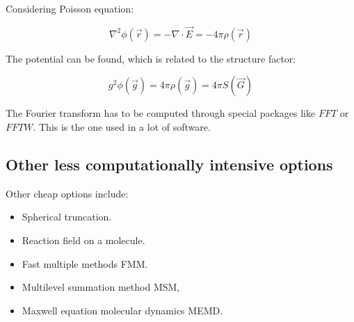 	Considering Poisson equation:

	$$\nabla^2\phi(\vec{r}) = -\nabla\cdot\vec{E} = -4\pi\rho(\vec{r})$$

	The potential can be found, which is related to the structure factor:

	$$g^2\phi(\vec{g}) = 4\pi\rho(\vec{g}) = 4\pi S(\vec{G})$$

	The Fourier transform has to be computed through special packages like $FFT$ or $FFTW$.
	This is the one used in a lot of software.

	\subsection{Other less computationally intensive options}
	Other cheap options include:

	\begin{multicols}{2}
		\begin{itemize}
			\item Spherical truncation.
			\item Reaction field on a molecule.
			\item Fast multiple methods FMM.
			\item Multilevel summation method MSM,
			\item Maxwell equation molecular dynamics MEMD.
		\end{itemize}
	\end{multicols}
